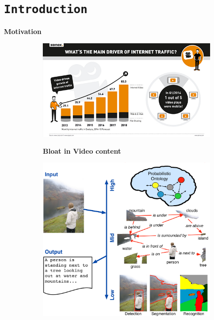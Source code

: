 \section{\texttt{Introduction}}
\begin{frame}{\textbf{Motivation}}
\begin{figure}
	\centering
	\begin{subfigure}[c]{0.4\textwidth}
		\includegraphics[width=\textwidth]{./img/motivation0.png} 
		 \begin{scriptsize} \begin{center}
		 \textbf{Bloat in Video content \footnotemark}
		\end{center} \end{scriptsize} 		
    \end{subfigure}\hspace{1em}	
	\begin{subfigure}[c]{0.3\textwidth}
		\includegraphics[width=\textwidth]{./img/motivation1.png} 

\end{subfigure}
\end{figure}
\end{frame}
